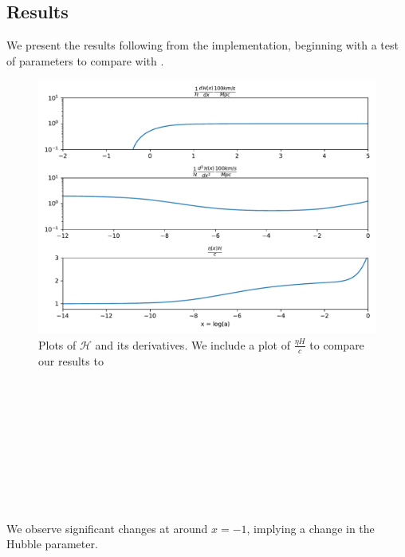 \documentclass{aa}
\begin{document}
\subsection{Results}
We present the results following from the implementation, beginning with a test of parameters to compare with \cite{3}.
\begin{figure}[h!]
   \includegraphics[scale=0.4]{Figures/milestone_1/test.pdf}
   \caption{Plots of $\mathcal{H}$ and its derivatives. We include a plot of $\frac{\eta H}{c}$ to compare our results to \cite{3}}\label{fig:M1_1_H_dHdx}
\end{figure}\\ \\ \\ \\ \\ \\ \\ \\ \\
We observe significant changes at around $x=-1$, implying a change in the Hubble parameter.
\end{document}
